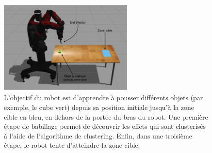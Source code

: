 \documentclass{llncs}
\begin{document}

\begin{figure}[ht]
  \begin{center}
    \includegraphics[width=0.6\textwidth]{figures/Experiment_setup_annoted_FR.png}
    \caption{L'objectif du robot est d'apprendre à pousser différents objets (par exemple, le cube vert) depuis sa position initiale jusqu'à la zone cible en bleu, en dehors de la portée du bras du robot. Une première étape de babillage permet de découvrir les effets qui sont clusterisés à l'aide de l'algorithme de clustering. Enfin, dans une troisième étape, le robot tente d'atteindre la zone cible.}
    \label{fig:setup}
  \end{center}
\end{figure}
\end{document}
